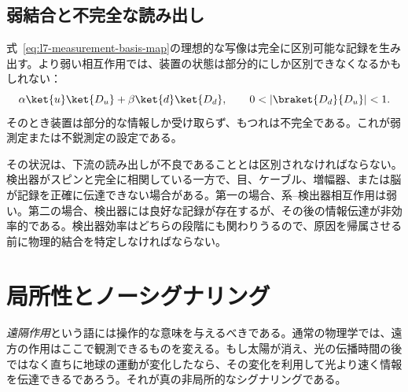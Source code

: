 \begin{classroomqa}
\end{classroomqa}

\subsection{弱結合と不完全な読み出し}

式~\eqref{eq:l7-measurement-basis-map}の理想的な写像は完全に区別可能な記録を生み出す。より弱い相互作用では、装置の状態は部分的にしか区別できなくなるかもしれない：
\begin{equation}
\alpha\ket{u}\ket{D_u}
+\beta\ket{d}\ket{D_d},
\qquad
0<|\braket{D_d}{D_u}|<1.
\label{eq:l7-weak-measurement}
\end{equation}
そのとき装置は部分的な情報しか受け取らず、もつれは不完全である。これが弱測定または不鋭測定の設定である。

その状況は、下流の読み出しが不良であることとは区別されなければならない。検出器がスピンと完全に相関している一方で、目、ケーブル、増幅器、または脳が記録を正確に伝達できない場合がある。第一の場合、系--検出器相互作用は弱い。第二の場合、検出器には良好な記録が存在するが、その後の情報伝達が非効率的である。検出器効率はどちらの段階にも関わりうるので、原因を帰属させる前に物理的結合を特定しなければならない。

\begin{classroomqa}
\end{classroomqa}

\section{局所性とノーシグナリング}

\emph{遠隔作用}という語には操作的な意味を与えるべきである。通常の物理学では、遠方の作用はここで観測できるものを変える。もし太陽が消え、光の伝播時間の後ではなく直ちに地球の運動が変化したなら、その変化を利用して光より速く情報を伝達できるであろう。それが真の非局所的なシグナリングである。

